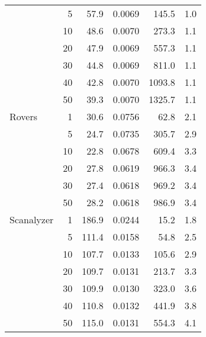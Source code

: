 \begin{table}[!h]
{\begin{tabular}{lrrrrr}
         & 5 &        57.9 &      0.0069 &               145.5 &                           1.0 \\
         & 10 &        48.6 &      0.0070 &               273.3 &                           1.1 \\
         & 20 &        47.9 &      0.0069 &               557.3 &                           1.1 \\
         & 30 &        44.8 &      0.0069 &               811.0 &                           1.1 \\
         & 40 &        42.8 &      0.0070 &              1093.8 &                           1.1 \\
         & 50 &        39.3 &      0.0070 &              1325.7 &                           1.1 \\ \midrule
Rovers   & 1 &        30.6 &      0.0756 &                62.8 &                           2.1 \\
         & 5 &        24.7 &      0.0735 &               305.7 &                           2.9 \\
         & 10 &        22.8 &      0.0678 &               609.4 &                           3.3 \\
         & 20 &        27.8 &      0.0619 &               966.3 &                           3.4 \\
         & 30 &        27.4 &      0.0618 &               969.2 &                           3.4 \\
         & 50 &        28.2 &      0.0618 &               986.9 &                           3.4 \\ \midrule
Scanalyzer & 1 &       186.9 &      0.0244 &                15.2 &                           1.8 \\
         & 5 &       111.4 &      0.0158 &                54.8 &                           2.5 \\
         & 10 &       107.7 &      0.0133 &               105.6 &                           2.9 \\
         & 20 &       109.7 &      0.0131 &               213.7 &                           3.3 \\
         & 30 &       109.9 &      0.0130 &               323.0 &                           3.6 \\
         & 40 &       110.8 &      0.0132 &               441.9 &                           3.8 \\
         & 50 &       115.0 &      0.0131 &               554.3 &                           4.1 \\ \midrule

\end{tabular}}
\end{table}
